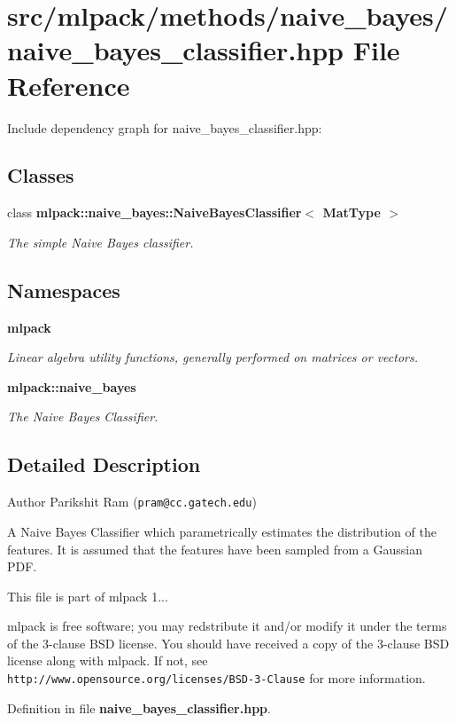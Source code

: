 \section{src/mlpack/methods/naive\-\_\-bayes/naive\-\_\-bayes\-\_\-classifier.hpp File Reference}
\label{naive__bayes__classifier_8hpp}
Include dependency graph for naive\-\_\-bayes\-\_\-classifier.\-hpp\-:
\subsection*{Classes}
\begin{DoxyCompactItemize}
\item 
class {\bf mlpack\-::naive\-\_\-bayes\-::\-Naive\-Bayes\-Classifier$<$ Mat\-Type $>$}
\begin{DoxyCompactList}\small\item\em The simple Naive Bayes classifier. \end{DoxyCompactList}\end{DoxyCompactItemize}
\subsection*{Namespaces}
\begin{DoxyCompactItemize}
\item 
{\bf mlpack}
\begin{DoxyCompactList}\small\item\em Linear algebra utility functions, generally performed on matrices or vectors. \end{DoxyCompactList}\item 
{\bf mlpack\-::naive\-\_\-bayes}
\begin{DoxyCompactList}\small\item\em The Naive Bayes Classifier. \end{DoxyCompactList}\end{DoxyCompactItemize}


\subsection{Detailed Description}
\begin{DoxyAuthor}{Author}
Parikshit Ram ({\tt pram@cc.\-gatech.\-edu})
\end{DoxyAuthor}
A Naive Bayes Classifier which parametrically estimates the distribution of the features. It is assumed that the features have been sampled from a Gaussian P\-D\-F.

This file is part of mlpack 1...

mlpack is free software; you may redstribute it and/or modify it under the terms of the 3-\/clause B\-S\-D license. You should have received a copy of the 3-\/clause B\-S\-D license along with mlpack. If not, see {\tt http\-://www.\-opensource.\-org/licenses/\-B\-S\-D-\/3-\/\-Clause} for more information. 

Definition in file {\bf naive\-\_\-bayes\-\_\-classifier.\-hpp}.

